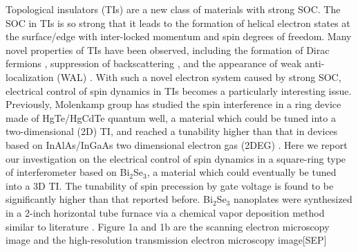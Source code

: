 {\begin{enumerate}
Topological insulators (TIs) \cite{TI1,TI2,TI3} are a new class of materials with strong SOC. The SOC in TIs is so strong that it leads to the formation of helical electron states at the surface/edge with inter-locked momentum and spin degrees of freedom. Many novel properties of TIs have been observed, including the formation of Dirac fermions \cite{TI4,TI5,TI6,TI7}, suppression of backscattering \cite{backscattering}, and the appearance of weak anti-localization (WAL) \cite{WAL1, WAL2, WAL3, WAL4, WAL5}. With such a novel electron system caused by strong SOC, electrical control of spin dynamics in TIs becomes a particularly interesting issue. Previously, Molenkamp group has studied the spin interference in a ring device made of HgTe/HgCdTe quantum well, a material which could be tuned into a two-dimensional (2D) TI, and reached a tunability higher than that in devices based on InAlAs/InGaAs two dimensional electron gas (2DEG) \cite{Rashba2, Rashba6}. Here we report our investigation on the electrical control of spin dynamics in a square-ring type of interferometer based on Bi$_2$Se$_3$, a material which could eventually be tuned into a 3D TI. The tunability of spin precession by gate voltage is found to be significantly higher than that reported before.
Bi$_2$Se$_3$ nanoplates were synthesized in a 2-inch horizontal tube furnace via a chemical vapor deposition method similar to literature \cite{HgTe}. Figure 1a and 1b are the scanning electron microscopy image and the high-resolution transmission electron microscopy image[SEP]
\importpackages{}
\graphicspath{ {./images/} }



\end{enumerate}}
